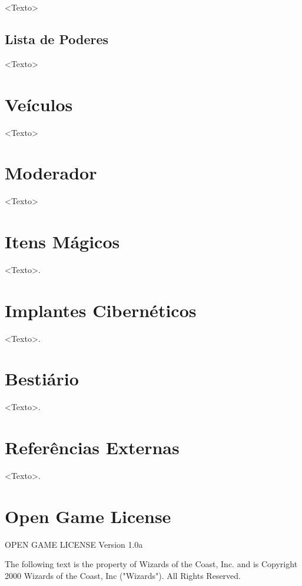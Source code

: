 \documentclass[a4paper, twocolumn, 10pt]{book}
\begin{document}
<Texto>

\section{Lista de Poderes}

<Texto>

\chapter{Veículos}

<Texto>

\chapter{Moderador}

<Texto>

\appendix

\chapter{Itens Mágicos}

<Texto>.

\chapter{Implantes Cibernéticos}

<Texto>.

\chapter{Bestiário}

<Texto>.

\chapter{Referências Externas}

<Texto>.

\chapter{Open Game License}

OPEN GAME LICENSE Version 1.0a

The following text is the property of Wizards of the Coast, Inc. and is Copyright 2000 Wizards of the Coast, Inc ("Wizards"). All Rights Reserved.
\end{document}
